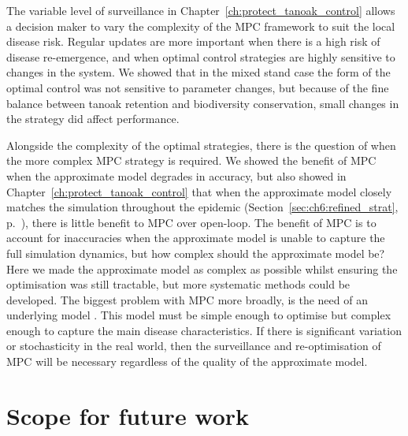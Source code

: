 The variable level of surveillance in Chapter~\ref{ch:protect_tanoak_control} allows a decision maker to vary the complexity of the MPC framework to suit the local disease risk. Regular updates are more important when there is a high risk of disease re-emergence, and when optimal control strategies are highly sensitive to changes in the system. We showed that in the mixed stand case the form of the optimal control was not sensitive to parameter changes, but because of the fine balance between tanoak retention and biodiversity conservation, small changes in the strategy did affect performance.

Alongside the complexity of the optimal strategies, there is the question of when the more complex MPC strategy is required. We showed the benefit of MPC when the approximate model degrades in accuracy, but also showed in Chapter~\ref{ch:protect_tanoak_control} that when the approximate model closely matches the simulation throughout the epidemic (Section~\ref{sec:ch6:refined_strat}, p.~\pageref{sec:ch6:refined_strat}), there is little benefit to MPC over open-loop. The benefit of MPC is to account for inaccuracies when the approximate model is unable to capture the full simulation dynamics, but how complex should the approximate model be? Here we made the approximate model as complex as possible whilst ensuring the optimisation was still tractable, but more systematic methods could be developed. The biggest problem with MPC more broadly, is the need of an underlying model \citep{camacho_model_1995}. This model must be simple enough to optimise but complex enough to capture the main disease characteristics. If there is significant variation or stochasticity in the real world, then the surveillance and re-optimisation of MPC will be necessary regardless of the quality of the approximate model.

\section{Scope for future work}

